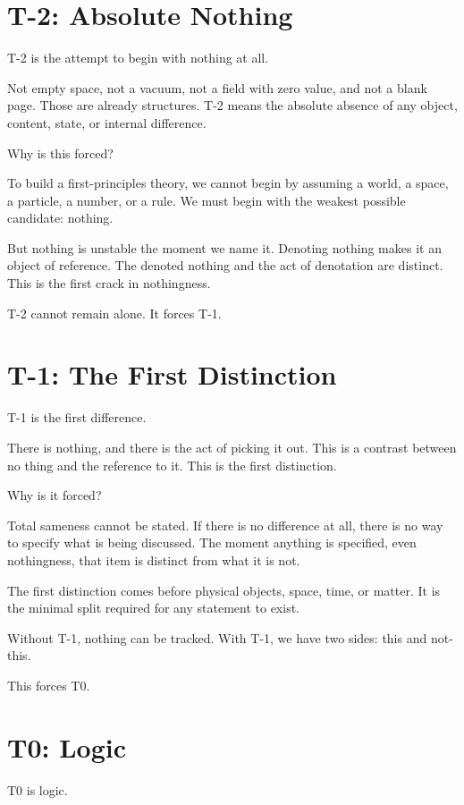 \documentclass[11pt]{article}
\begin{document}
\section{T-2: Absolute Nothing}

T-2 is the attempt to begin with nothing at all.

Not empty space, not a vacuum, not a field with zero value, and not a blank page. Those are already structures. T-2 means the absolute absence of any object, content, state, or internal difference.

Why is this forced?

To build a first-principles theory, we cannot begin by assuming a world, a space, a particle, a number, or a rule. We must begin with the weakest possible candidate: nothing.

But nothing is unstable the moment we name it. Denoting nothing makes it an object of reference. The denoted nothing and the act of denotation are distinct. This is the first crack in nothingness.

T-2 cannot remain alone. It forces T-1.

\section{T-1: The First Distinction}

T-1 is the first difference.

There is nothing, and there is the act of picking it out. This is a contrast between no thing and the reference to it. This is the first distinction.

Why is it forced?

Total sameness cannot be stated. If there is no difference at all, there is no way to specify what is being discussed. The moment anything is specified, even nothingness, that item is distinct from what it is not.

The first distinction comes before physical objects, space, time, or matter. It is the minimal split required for any statement to exist.

Without T-1, nothing can be tracked. With T-1, we have two sides: this and not-this.

This forces T0.

\section{T0: Logic}

T0 is logic.
\end{document}
